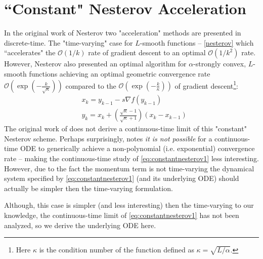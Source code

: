 \section{``Constant" Nesterov Acceleration}
In the original work of Nesterov \cite{DBLP:journals/ftml/Bubeck15, nesterov2004introductory} two "acceleration" methods are presented in discrete-time. The "time-varying" case for $L$-smooth functions -- \eqref{nesterov} which ``accelerates" the $\mathcal{O}(1/k)$ rate of gradient descent to an optimal $\mathcal{O}(1/k^2)$ rate. However, Nesterov also presented an optimal algorithm for $\alpha$-strongly convex, $L$-smooth functions achieving an optimal geometric convergence rate $\mathcal{O} \left (\exp(-\frac{k}{\sqrt{\kappa}}) \right)$ compared to the $\mathcal{O} \left (\exp(-\frac{k}{\kappa}) \right)$ of gradient descent\footnote{Here $\kappa$ is the condition number of the function defined as $\kappa = \sqrt{L/\alpha}$.}:
\begin{align}
    & x_{k} = y_{k-1} - s \nabla f(y_{k-1}) \label{eq:constantnesterov1} \\
    & y_{k} = x_{k} + \left( \frac{\sqrt{\kappa}-1}{\sqrt{\kappa}+1} \right) \left( x_{k} - x_{k-1} \right)  \label{eq:constantnesterov2}
\end{align}
 The original work of \cite{su2014differential} does not derive a continuous-time limit of this "constant" Nesterov scheme. Perhaps surprisingly, \cite{su2014differential} notes \textit{it is not possible} for a continuous-time ODE to generically achieve a non-polynomial (i.e. exponential) convergence rate -- making the continuous-time study of \eqref{eq:constantnesterov1} less interesting. However, due to the fact the momentum term is not time-varying the dynamical system specified by \eqref{eq:constantnesterov1}  (and its underlying ODE) should actually be simpler then the time-varying formulation. 
 
 Although, this case is simpler (and less interesting) then the time-varying to our knowledge, the continuous-time limit of \eqref{eq:constantnesterov1} has not been analyzed, so we derive the underlying ODE here. 
 
